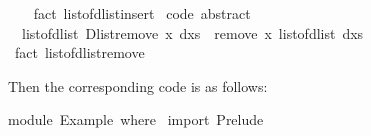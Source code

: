\begin{isabellebody}
\ \ \isamarkupfalse%
\ {}fact\ list{}of{}dlist{}insert{}\isanewline
\isanewline
{}\isamarkupfalse%
\ {}code\ abstract{}{}\isanewline
\ \ {}list{}of{}dlist\ {}Dlist{}remove\ x\ dxs{}\ {}\ remove{}\ x\ {}list{}of{}dlist\ dxs{}{}\isanewline
\ \ \isamarkupfalse%
\ {}fact\ list{}of{}dlist{}remove{}%
\endisatagquote
{\isafoldquote}%
%
\isadelimquote
%
\endisadelimquote
%
\begin{isamarkuptext}%
\noindent Then the corresponding code is as follows:%
\end{isamarkuptext}%
\isamarkuptrue%
%
\isadelimquotetypewriter
%
\endisadelimquotetypewriter
%
\isatagquotetypewriter
%
\begin{isamarkuptext}%
module\ Example\ where\ {}\isanewline
\isanewline
import\ Prelude\ {}{}{}{}{}{}\ {}{}{}{}{}\ {}{}{}{}\ {}{}{}{}{}\ {}{}{}{}{}\ {}{}{}{}\ {}{}{}{}\ {}{}{}{}\ {}{}{}{}\ {}{}{}{}\isanewline

\end{isamarkuptext}
\end{isabellebody}

